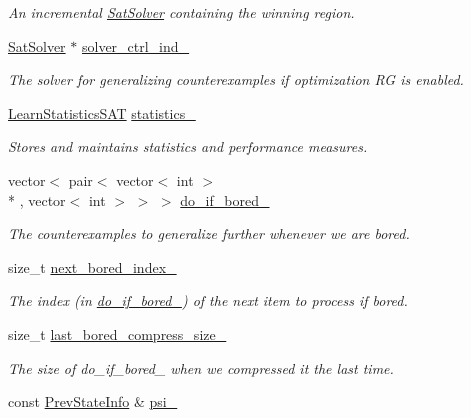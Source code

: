 \begin{DoxyCompactItemize}
\begin{DoxyCompactList}\small\item\em An incremental \hyperlink{classSatSolver}{Sat\-Solver} containing the winning region. \end{DoxyCompactList}\item 
\hyperlink{classSatSolver}{Sat\-Solver} $\ast$ \hyperlink{classCounterGenSAT_a33c1b5637bdd766a7d2b8ff2e3147eca}{solver\-\_\-ctrl\-\_\-ind\-\_\-}
\begin{DoxyCompactList}\small\item\em The solver for generalizing counterexamples if optimization R\-G is enabled. \end{DoxyCompactList}\item 
\hyperlink{classLearnStatisticsSAT}{Learn\-Statistics\-S\-A\-T} \hyperlink{classCounterGenSAT_a0e7c47014a35bac7a6de0a61ee8d2c22}{statistics\-\_\-}
\begin{DoxyCompactList}\small\item\em Stores and maintains statistics and performance measures. \end{DoxyCompactList}\item 
vector$<$ pair$<$ vector$<$ int $>$\\*
, vector$<$ int $>$ $>$ $>$ \hyperlink{classCounterGenSAT_ae4f7bf80b40a44580fde913f300ac4c1}{do\-\_\-if\-\_\-bored\-\_\-}
\begin{DoxyCompactList}\small\item\em The counterexamples to generalize further whenever we are bored. \end{DoxyCompactList}\item 
size\-\_\-t \hyperlink{classCounterGenSAT_a404764a6142a0cd55e1b3e40d2e0483b}{next\-\_\-bored\-\_\-index\-\_\-}
\begin{DoxyCompactList}\small\item\em The index (in \hyperlink{classCounterGenSAT_ae4f7bf80b40a44580fde913f300ac4c1}{do\-\_\-if\-\_\-bored\-\_\-}) of the next item to process if bored. \end{DoxyCompactList}\item 
size\-\_\-t \hyperlink{classCounterGenSAT_ae3befc2cd3c74b65e055f7d29dcc9c05}{last\-\_\-bored\-\_\-compress\-\_\-size\-\_\-}
\begin{DoxyCompactList}\small\item\em The size of do\-\_\-if\-\_\-bored\-\_\- when we compressed it the last time. \end{DoxyCompactList}\item 
const \hyperlink{classPrevStateInfo}{Prev\-State\-Info} \& \hyperlink{classCounterGenSAT_a68c5a01f380979af79bf45061a9a1e37}{psi\-\_\-}

\end{DoxyCompactItemize}
